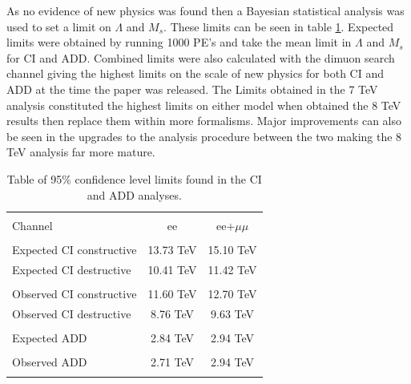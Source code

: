 	As no evidence of new physics was found then a Bayesian statistical analysis was used to set a limit on $\Lambda$ and $M_{s}$. These limits can be seen in table \ref{tab:Limits7}. Expected limits were obtained by running 1000 PE's and take the mean limit in $\Lambda$ and $M_{s}$ for CI and ADD. Combined limits were also calculated with the dimuon search channel giving the highest limits on the scale of new physics for both CI and ADD at the time the paper was released.
	The Limits obtained in the 7 TeV analysis constituted the highest limits on either model when obtained  the 8 TeV results then replace them within more formalisms. Major improvements can also be seen in the upgrades to the analysis procedure between the two making the 8 TeV analysis far more mature. 


	\begin{table}[h!]
	\centering %
	\begin{tabular}{l cc} %
	\hline\hline \\[-2ex] %
	Channel & ee & ee+$\mu\mu$\\  [0.2ex]
	\hline  \\[-2ex] %
	Expected CI constructive & 13.73 TeV & 15.10 TeV\\ 
	Expected CI destructive & 10.41 TeV & 11.42 TeV \\ 
	\hline  \\[-2ex] %
	Observed CI constructive & 11.60 TeV & 12.70 TeV \\ 
	Observed CI destructive & 8.76 TeV & 9.63 TeV \\ 
	\hline\hline  \\[-2ex] %
	Expected ADD & 2.84 TeV & 2.94 TeV \\ 
	\hline  \\[-2ex] %
	Observed ADD & 2.71 TeV & 2.94 TeV \\ 
	\hline\hline  \\ %
	\end{tabular}
	\caption{Table of 95\% confidence level limits found in the CI and ADD analyses.} %
	\label{tab:Limits7}
	\end{table}











































